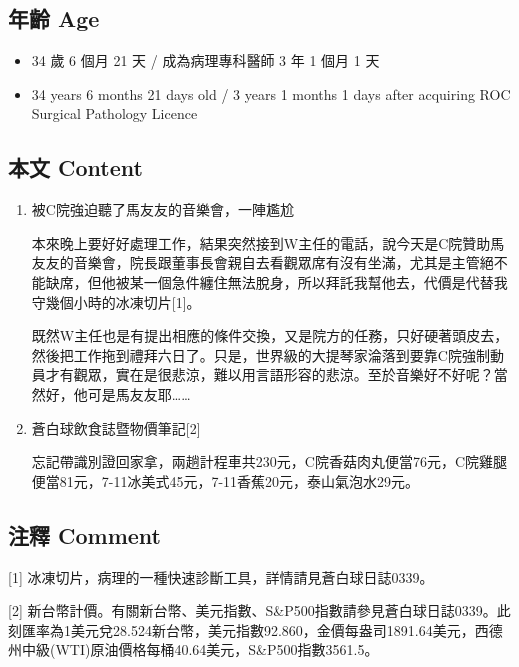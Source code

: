 \documentclass[a5paper, 11pt
]{book}
\providecommand{\tightlist}{%
  \setlength{\itemsep}{0pt}\setlength{\parskip}{0pt}}
\begin{document}
\hypertarget{ux5e74ux9f61-age-67}{%
\subsection{年齡 Age}\label{ux5e74ux9f61-age-67}}

\begin{itemize}
\tightlist
\item
  34 歲 6 個月 21 天 / 成為病理專科醫師 3 年 1 個月 1 天
\item
  34 years 6 months 21 days old / 3 years 1 months 1 days after
  acquiring ROC Surgical Pathology Licence
\end{itemize}

\hypertarget{ux672cux6587-content-67}{%
\subsection{本文 Content}\label{ux672cux6587-content-67}}

\begin{enumerate}
\def\labelenumi{\arabic{enumi}.}
\item
  被C院強迫聽了馬友友的音樂會，一陣尷尬

  本來晚上要好好處理工作，結果突然接到W主任的電話，說今天是C院贊助馬友友的音樂會，院長跟董事長會親自去看觀眾席有沒有坐滿，尤其是主管絕不能缺席，但他被某一個急件纏住無法脫身，所以拜託我幫他去，代價是代替我守幾個小時的冰凍切片{[}1{]}。

  既然W主任也是有提出相應的條件交換，又是院方的任務，只好硬著頭皮去，然後把工作拖到禮拜六日了。只是，世界級的大提琴家淪落到要靠C院強制動員才有觀眾，實在是很悲涼，難以用言語形容的悲涼。至於音樂好不好呢？當然好，他可是馬友友耶\ldots\ldots{}
\item
  蒼白球飲食誌暨物價筆記{[}2{]}

  忘記帶識別證回家拿，兩趟計程車共230元，C院香菇肉丸便當76元，C院雞腿便當81元，7-11冰美式45元，7-11香蕉20元，泰山氣泡水29元。
\end{enumerate}

\hypertarget{ux6ce8ux91cb-comment-67}{%
\subsection{注釋 Comment}\label{ux6ce8ux91cb-comment-67}}

{[}1{]} 冰凍切片，病理的一種快速診斷工具，詳情請見蒼白球日誌0339。

{[}2{]}
新台幣計價。有關新台幣、美元指數、S\&P500指數請參見蒼白球日誌0339。此刻匯率為1美元兌28.524新台幣，美元指數92.860，金價每盎司1891.64美元，西德州中級(WTI)原油價格每桶40.64美元，S\&P500指數3561.5。
\end{document}
